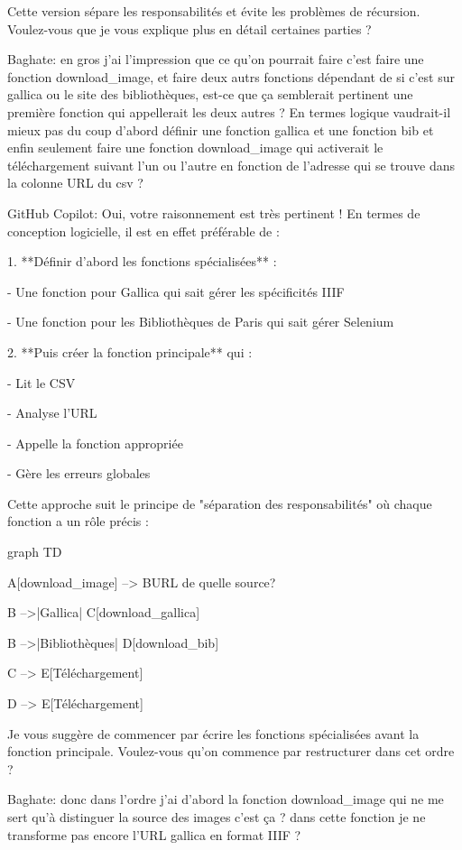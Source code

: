 Cette version sépare les responsabilités et évite les problèmes de récursion. Voulez-vous que je vous explique plus en détail certaines parties ?

Baghate: en gros j'ai l'impression que ce qu'on pourrait faire c'est faire une fonction download\_image, et faire deux autrs fonctions dépendant de si c'est sur gallica ou le site des bibliothèques, est-ce que ça semblerait pertinent une première fonction qui appellerait les deux autres ? En termes logique vaudrait-il mieux pas du coup d'abord définir une fonction gallica et une fonction bib et enfin seulement faire une fonction download\_image qui activerait le téléchargement suivant l'un ou l'autre en fonction de l'adresse qui se trouve dans la colonne URL du csv ?

GitHub Copilot: Oui, votre raisonnement est très pertinent ! En termes de conception logicielle, il est en effet préférable de :

1. **Définir d'abord les fonctions spécialisées** :

- Une fonction pour Gallica qui sait gérer les spécificités IIIF

- Une fonction pour les Bibliothèques de Paris qui sait gérer Selenium

2. **Puis créer la fonction principale** qui :

- Lit le CSV

- Analyse l'URL

- Appelle la fonction appropriée

- Gère les erreurs globales

Cette approche suit le principe de "séparation des responsabilités" où chaque fonction a un rôle précis :

graph TD

A[download\_image] --> B{URL de quelle source?}

B -->|Gallica| C[download\_gallica]

B -->|Bibliothèques| D[download\_bib]

C --> E[Téléchargement]

D --> E[Téléchargement]

Je vous suggère de commencer par écrire les fonctions spécialisées avant la fonction principale. Voulez-vous qu'on commence par restructurer dans cet ordre ?

Baghate: donc dans l'ordre j'ai d'abord la fonction download\_image qui ne me sert qu'à distinguer la source des images c'est ça ? dans cette fonction je ne transforme pas encore l'URL gallica en format IIIF ?

